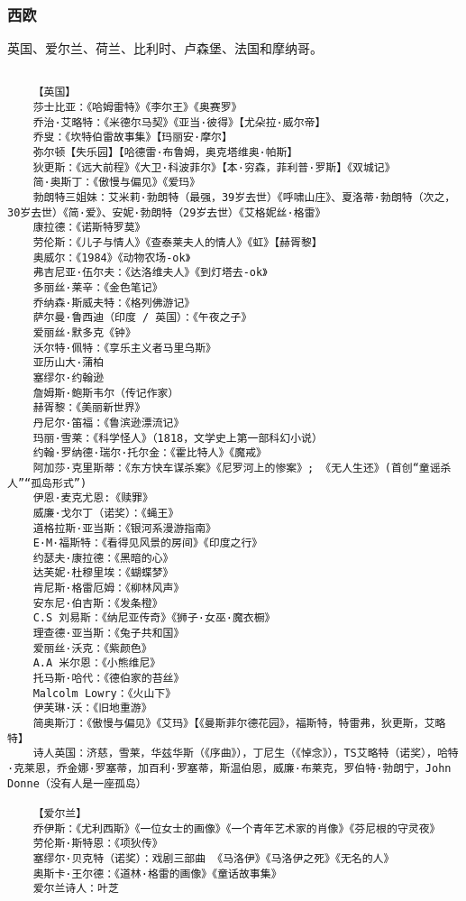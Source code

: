 \documentclass[UTF8]{../RepresentationUniverse}
\begin{document}
\subsubsection{西欧}
英国、爱尔兰、荷兰、比利时、卢森堡、法国和摩纳哥。
\begin{lstlisting}

    【英国】
    莎士比亚：《哈姆雷特》《李尔王》《奥赛罗》
    乔治·艾略特：《米德尔马契》《亚当·彼得》【尤朵拉·威尔帝】
    乔叟：《坎特伯雷故事集》【玛丽安·摩尔】
    弥尔顿【失乐园】【哈德雷·布鲁姆，奥克塔维奥·帕斯】
    狄更斯：《远大前程》《大卫·科波菲尔》【本·穷森，菲利普·罗斯】《双城记》
    简·奥斯丁：《傲慢与偏见》《爱玛》
    勃朗特三姐妹：艾米莉·勃朗特（最强，39岁去世）《呼啸山庄》、夏洛蒂·勃朗特（次之，30岁去世）《简·爱》、安妮·勃朗特（29岁去世）《艾格妮丝·格雷》
    康拉德：《诺斯特罗莫》
    劳伦斯：《儿子与情人》《查泰莱夫人的情人》《虹》【赫胥黎】
    奥威尔：《1984》《动物农场-ok》
    弗吉尼亚·伍尔夫：《达洛维夫人》《到灯塔去-ok》
    多丽丝·莱辛：《金色笔记》
    乔纳森·斯威夫特：《格列佛游记》
    萨尔曼·鲁西迪（印度 / 英国）：《午夜之子》
    爱丽丝·默多克《钟》
    沃尔特·佩特：《享乐主义者马里乌斯》
    亚历山大·蒲柏
    塞缪尔·约翰逊
    詹姆斯·鲍斯韦尔（传记作家）
    赫胥黎：《美丽新世界》
    丹尼尔·笛福：《鲁滨逊漂流记》
    玛丽·雪莱：《科学怪人》（1818，文学史上第一部科幻小说）
    约翰·罗纳德·瑞尔·托尔金：《霍比特人》《魔戒》
    阿加莎·克里斯蒂：《东方快车谋杀案》《尼罗河上的惨案》; 《无人生还》(首创“童谣杀人”“孤岛形式”)
    伊恩·麦克尤恩:《赎罪》
    威廉·戈尔丁（诺奖）：《蝇王》
    道格拉斯·亚当斯：《银河系漫游指南》
    E·M·福斯特：《看得见风景的房间》《印度之行》
    约瑟夫·康拉德：《黑暗的心》
    达芙妮·杜穆里埃：《蝴蝶梦》
    肯尼斯·格雷厄姆：《柳林风声》
    安东尼·伯吉斯：《发条橙》
    C.S 刘易斯：《纳尼亚传奇》《狮子·女巫·魔衣橱》
    理查德·亚当斯：《兔子共和国》
    爱丽丝·沃克：《紫颜色》
    A.A 米尔恩：《小熊维尼》
    托马斯·哈代：《德伯家的苔丝》
    Malcolm Lowry：《火山下》
    伊芙琳·沃：《旧地重游》
    简奥斯汀：《傲慢与偏见》《艾玛》【《曼斯菲尔德花园》，福斯特，特雷弗，狄更斯，艾略特】
    诗人英国：济慈，雪莱，华兹华斯（《序曲》），丁尼生（《悼念》），TS艾略特（诺奖），哈特·克莱恩，乔金娜·罗塞蒂，加百利·罗塞蒂，斯温伯恩，威廉·布莱克，罗伯特·勃朗宁，John Donne（没有人是一座孤岛）
    
    【爱尔兰】
    乔伊斯：《尤利西斯》《一位女士的画像》《一个青年艺术家的肖像》《芬尼根的守灵夜》
    劳伦斯·斯特恩：《项狄传》
    塞缪尔·贝克特（诺奖）：戏剧三部曲 《马洛伊》《马洛伊之死》《无名的人》
    奥斯卡·王尔德：《道林·格雷的画像》《童话故事集》
    爱尔兰诗人：叶芝


\end{lstlisting}
\end{document}
